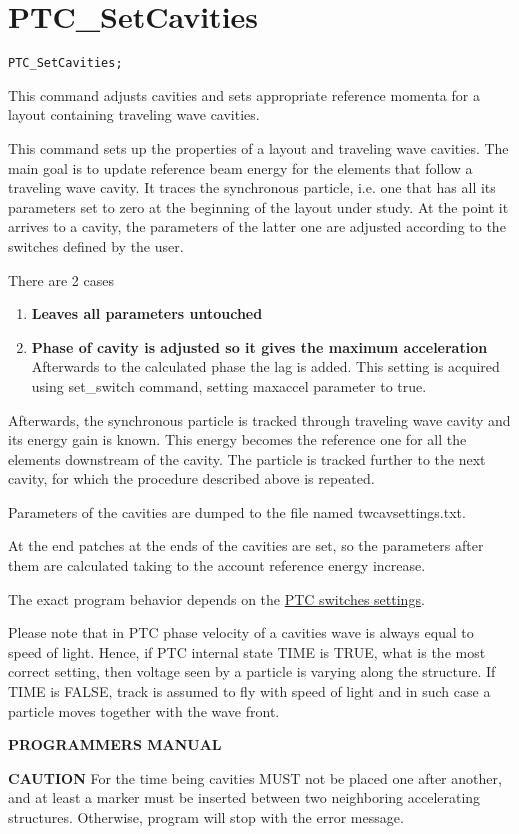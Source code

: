 \section{PTC\_SetCavities}

\begin{verbatim}
PTC_SetCavities;
\end{verbatim}

This command adjusts cavities and sets appropriate reference momenta for
a layout containing traveling wave cavities.

This command sets up the properties of a layout and traveling wave
cavities.  The main goal is to update  reference beam energy for the
elements  that follow a traveling wave cavity.  It traces the
synchronous particle, i.e. one that has  all its parameters set to zero
at the beginning of the layout under study. At the point it arrives to a
cavity,  the parameters of the latter one are adjusted according to the
switches  defined by the user. 

There are 2 cases   
\begin{enumerate}
   \item \textbf{Leaves all parameters untouched}
   \item \textbf{Phase of cavity is adjusted so it gives the maximum
     acceleration} Afterwards to the calculated phase the lag
     is added. This setting is acquired using set\_switch
     command, setting maxaccel parameter to true.   
\end{enumerate} 

Afterwards,  the synchronous particle is tracked through traveling wave
cavity  and its energy gain is known.  This energy becomes the reference
one for all the elements downstream of the cavity.  The particle is
tracked further to the next cavity,  for which the procedure described
above is repeated.    

Parameters of the cavities are dumped to the file named
twcavsettings.txt.    

At the end patches at the ends of the cavities are set,  so the
parameters after them are  calculated taking to the account reference
energy increase.   

The exact program behavior depends on the  \href{PTC_SetSwitch.html}{
  PTC switches settings}.   

Please note that in PTC phase velocity of a cavities wave is always
equal to speed of light.  Hence, if PTC internal state TIME is TRUE,
what is the most correct setting,  then voltage seen by a particle is
varying along the structure. If TIME is FALSE,  track is assumed to fly
with speed of light and in such case a particle moves together with the
wave front.    


{\bf PROGRAMMERS MANUAL}

{\bf CAUTION} For the time being cavities MUST not be placed one after
another, and at least a marker must be inserted between two neighboring
accelerating structures. Otherwise, program will stop with the error
message.    


